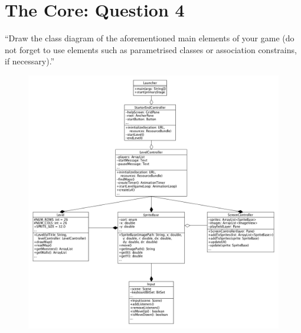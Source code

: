 \chapter{The Core: Question 4}

``Draw the class diagram of the aforementioned main elements of your game (do not forget to use elements such as parametrised classes or association constrains, if necessary).''

\begin{figure}[h]
\includegraphics[width=\textwidth]{classDiagramsMain}
\end{figure}